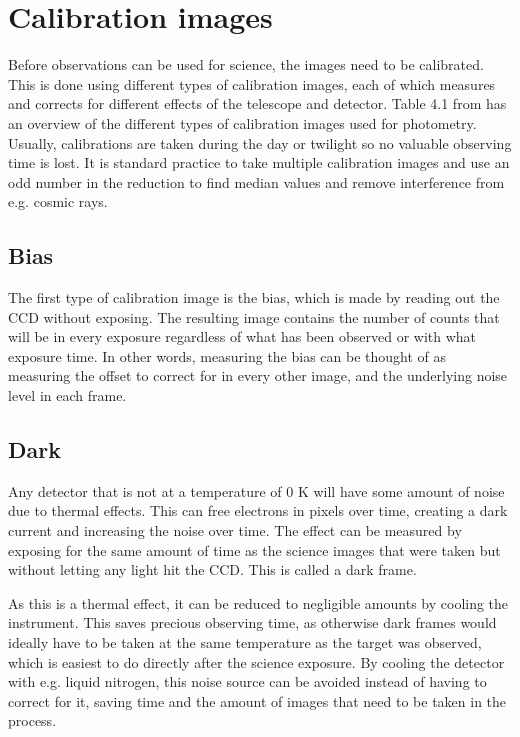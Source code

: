 \documentclass[a4paper,oneside,12pt, class=Latex/Classes/PhDthesisPSnPDF, crop=false]{standalone}
\begin{document}
\section{Calibration images}
\label{calibration}
Before observations can be used for science, the images need to be calibrated. This is done using different types of calibration images, each of which measures and corrects for different effects of the telescope and detector. Table 4.1 from \citet{CCD_handbook} has an overview of the different types of calibration images used for photometry. Usually, calibrations are taken during the day or twilight so no valuable observing time is lost. It is standard practice to take multiple calibration images and use an odd number in the reduction to find median values and remove interference from e.g. cosmic rays.


\subsection{Bias}
The first type of calibration image is the bias, which is made by reading out the CCD without exposing. The resulting image contains the number of counts that will be in every exposure regardless of what has been observed or with what exposure time. In other words, measuring the bias can be thought of as measuring the offset to correct for in every other image, and the underlying noise level in each frame.


\subsection{Dark}
Any detector that is not at a temperature of 0 K will have some amount of noise due to thermal effects. This can free electrons in pixels over time, creating a dark current and increasing the noise over time. The effect can be measured by exposing for the same amount of time as the science images that were taken but without letting any light hit the CCD. This is called a dark frame.

As this is a thermal effect, it can be reduced to negligible amounts by cooling the instrument. This saves precious observing time, as otherwise dark frames would ideally have to be taken at the same temperature as the target was observed, which is easiest to do directly after the science exposure. By cooling the detector with e.g. liquid nitrogen, this noise source can be avoided instead of having to correct for it, saving time and the amount of images that need to be taken in the process.
\end{document}
